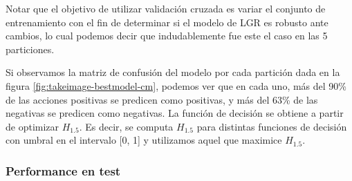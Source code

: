 Notar que el objetivo de utilizar validación cruzada es variar el conjunto de
entrenamiento con el fin de determinar si el modelo de LGR es robusto ante
cambios, lo cual podemos decir que indudablemente fue este el caso en las 5
particiones.

Si observamos la matriz de confusión del modelo por cada partición dada en la
figura \ref{fig:takeimage-bestmodel-cm}, podemos ver que en cada uno, más del
90\% de las acciones positivas se predicen como positivas, y más del 63\% de las
negativas se predicen como negativas. La función de decisión se obtiene a partir
de optimizar $H_{1.5}$. Es decir, se computa $H_{1.5}$ para distintas funciones
de decisión con umbral en el intervalo [0, 1] y utilizamos aquel que maximice
$H_{1.5}$. 

\begin{table}[h!]
    \centering
     \caption{Métricas en validación cruzada del modelo LGR con word embeddings.}
     \label{results:lgr-wb-takeimage-tb}
\end{table}

\subsubsection{Performance en test}

